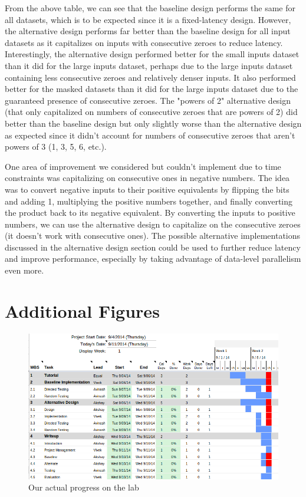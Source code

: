 \documentclass[10pt]{article}
\begin{document}
From the above table, we can see that the baseline design performs the same for all datasets, which is to be expected since it is a fixed-latency design. However, the alternative design performs far better than the baseline design for all input datasets as it capitalizes on inputs with consecutive zeroes to reduce latency. Interestingly, the alternative design performed better for the small inputs dataset than it did for the large inputs dataset, perhaps due to the large inputs dataset containing less consecutive zeroes and relatively denser inputs. It also performed better for the masked datasets than it did for the large inputs dataset due to the guaranteed presence of consecutive zeroes. The "powers of 2" alternative design (that only capitalized on numbers of consecutive zeroes that are powers of 2) did better than the baseline design but only slightly worse than the alternative design as expected since it didn't account for numbers of consecutive zeroes that aren't powers of 3 (1, 3, 5, 6, etc.). 

One area of improvement we considered but couldn't implement due to time constraints was capitalizing on consecutive ones in negative numbers. The idea was to convert negative inputs to their positive equivalents by flipping the bits and adding 1, multiplying the positive numbers together, and finally converting the product back to its negative equivalent. By converting the inputs to positive numbers, we can use the alternative design to capitalize on the consecutive zeroes (it doesn't work with consecutive ones). 
The possible alternative implementations discussed in the alternative design section could be used to further reduce latency and improve performance, especially by taking advantage of data-level parallelism even more. 

\section{Additional Figures}

\begin{figure}[h]
\centering
\includegraphics[scale=0.45]{gantt_actual}
\caption{Our actual progress on the lab}
\label{fig:gantt_actual}
\end{figure}
\end{document}
